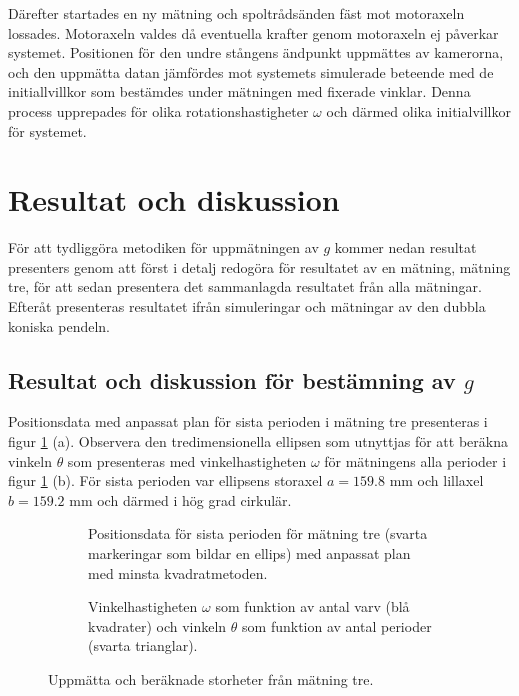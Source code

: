 \documentclass[12pt,a4paper]{article}
\newlength\fheight
\begin{document}
Därefter startades en ny mätning och spoltrådsänden fäst mot motoraxeln lossades. Motoraxeln valdes då eventuella krafter genom motoraxeln ej påverkar systemet. Positionen för den undre stångens ändpunkt uppmättes av kamerorna, och den uppmätta datan jämfördes mot systemets simulerade beteende med de initiallvillkor som bestämdes under mätningen med fixerade vinklar. Denna process upprepades för olika rotationshastigheter  $\omega$ och därmed olika initialvillkor för systemet.

\section{Resultat och diskussion}
För att tydliggöra metodiken för uppmätningen av $g$ kommer nedan resultat presenters genom att först i detalj redogöra för resultatet av en mätning, mätning tre, för att sedan presentera det sammanlagda resultatet från alla mätningar. Efteråt presenteras resultatet ifrån simuleringar och mätningar av den dubbla koniska pendeln.

\subsection{Resultat och diskussion för bestämning av $g$}
Positionsdata med anpassat plan för sista perioden i mätning tre presenteras i figur \ref{resultat: matning3} (a). Observera den tredimensionella ellipsen som utnyttjas för att beräkna vinkeln $\theta$ som presenteras med vinkelhastigheten $\omega$ för mätningens alla perioder i figur \ref{resultat: matning3} (b). För sista perioden var ellipsens storaxel $a = 159.8$ mm och lillaxel $b = 159.2$ mm och därmed i hög grad cirkulär.
\newline


\begin{figure}[H]
    \hspace{-40px}
    \centering
    \begin{subfigure}[b]{0.40\textwidth}
        \centering
        \setlength\fheight{1.8in}
        
        \caption{Positionsdata för sista perioden för mätning tre (svarta markeringar som bildar en ellips) med anpassat plan med minsta kvadratmetoden.}
    \end{subfigure}
    \hspace{30px}
    \begin{subfigure}[b]{0.45\textwidth}
        \centering
        \setlength\fheight{1.7in}
        
        \caption{Vinkelhastigheten $\omega$ som funktion av antal varv (blå kvadrater) och vinkeln $\theta$ som funktion av antal perioder (svarta trianglar).}
    \end{subfigure}
    \caption{Uppmätta och beräknade storheter från mätning tre.} 
    \label{resultat: matning3}
\end{figure}
\end{document}
